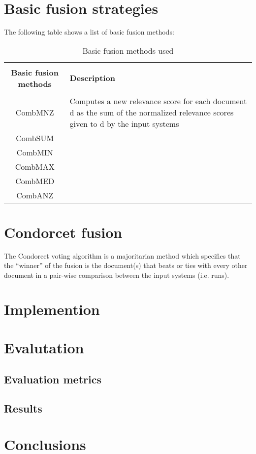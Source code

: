     \section{Basic fusion strategies}

    The following table shows a list of basic fusion methods:

    \begin{table}[H]
        \centering
        \begin{tabular}{|c|p{4cm}|}
        \hline \\
        \textbf{Basic fusion methods} & \textbf{Description} \\
        \hline \\
        CombMNZ & Computes a new relevance score for each document d as
            the sum of the normalized relevance scores given to d by the input
            systems \\
        \hline
        CombSUM & \\
        CombMIN & \\
        CombMAX & \\
        CombMED & \\
        CombANZ & \\
        \hline
        \end{tabular}
        \caption{Basic fusion methods used}
    \end{table}
    
    \section{Condorcet fusion}

    The Condorcet voting algorithm is a majoritarian method which specifies
    that the ``winner'' of the fusion is the document(s) that beats or ties
    with every other document in a pair-wise comparison between the input
    systems (i.e. runs).

    \section{Implemention}
    \section{Evalutation}
    		  
        \subsection{Evaluation metrics}
			
	    \subsection{Results}

	\section{Conclusions}
	


